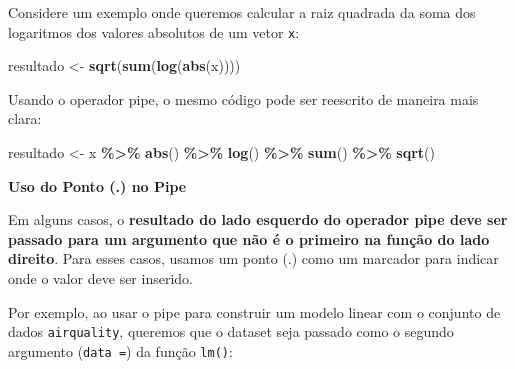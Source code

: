\documentclass[
]{book}
\newenvironment{Shaded}{\begin{snugshade}}{\end{snugshade}}
\newcommand{\FunctionTok}[1]{\textcolor[rgb]{0.13,0.29,0.53}{\textbf{#1}}}
\newcommand{\NormalTok}[1]{#1}
\newcommand{\OtherTok}[1]{\textcolor[rgb]{0.56,0.35,0.01}{#1}}
\newcommand{\SpecialCharTok}[1]{\textcolor[rgb]{0.81,0.36,0.00}{\textbf{#1}}}
\begin{document}
Considere um exemplo onde queremos calcular a raiz quadrada da soma dos
logaritmos dos valores absolutos de um vetor \texttt{x}:

\begin{Shaded}
\begin{Highlighting}[]
\NormalTok{resultado }\OtherTok{\textless{}{-}} \FunctionTok{sqrt}\NormalTok{(}\FunctionTok{sum}\NormalTok{(}\FunctionTok{log}\NormalTok{(}\FunctionTok{abs}\NormalTok{(x))))}
\end{Highlighting}
\end{Shaded}

Usando o operador pipe, o mesmo código pode ser reescrito de maneira
mais clara:

\begin{Shaded}
\begin{Highlighting}[]
\NormalTok{resultado }\OtherTok{\textless{}{-}}\NormalTok{ x }\SpecialCharTok{\%\textgreater{}\%} 
  \FunctionTok{abs}\NormalTok{() }\SpecialCharTok{\%\textgreater{}\%} 
  \FunctionTok{log}\NormalTok{() }\SpecialCharTok{\%\textgreater{}\%} 
  \FunctionTok{sum}\NormalTok{() }\SpecialCharTok{\%\textgreater{}\%} 
  \FunctionTok{sqrt}\NormalTok{()}
\end{Highlighting}
\end{Shaded}

\textbf{Uso do Ponto (.) no Pipe}

Em alguns casos, o \textbf{resultado do lado esquerdo do operador pipe deve ser passado para um argumento que não é o primeiro na função do lado direito}. Para esses casos, usamos um ponto (.) como um marcador para indicar onde o valor deve ser inserido.

Por exemplo, ao usar o pipe para construir um modelo linear com o
conjunto de dados \texttt{airquality}, queremos que o dataset seja passado como
o segundo argumento (\texttt{data\ =}) da função \texttt{lm()}:
\end{document}
